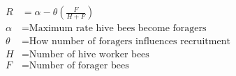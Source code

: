 \documentclass[fleqn, oneside, 11pt]{article}
\begin{document}
\begin{preview}
\begin{align*}
R & = \alpha - \theta \left(\frac{F}{H + F}\right) \nonumber \\
\alpha & =  \text{Maximum rate hive bees become foragers} \nonumber \\
\theta & =  \text{How number of foragers influences recruitment} \nonumber \\
H & =  \text{Number of hive worker bees} \nonumber \\
F & =  \text{Number of forager bees} \nonumber \\
\end{align*} 
\end{preview}
\end{document}

